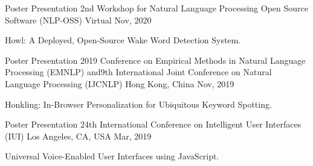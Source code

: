 \begin{cventries}
{\begin{cvitems}
\end{cvitems}
}
\cventry
{Poster Presentation} %
{2nd Workshop for Natural Language Processing Open Source Software (NLP-OSS)} %
{Virtual} %
{Nov, 2020} %
{ %
\begin{cvitems}
\item {Howl: A Deployed, Open-Source Wake Word Detection System.}
\end{cvitems}
}
\cventry
{Poster Presentation} %
{2019 Conference on Empirical Methods in Natural Language Processing (EMNLP) and\newline 9th International Joint Conference on Natural Language Processing (IJCNLP)} %
{Hong Kong, China} %
{Nov, 2019} %
{ %
\begin{cvitems}
\item {Honkling: In-Browser Personalization for Ubiquitous Keyword Spotting.}
\end{cvitems}
}
\cventry
{Poster Presentation} %
{24th International Conference on Intelligent User Interfaces (IUI)} %
{Los Angeles, CA, USA} %
{Mar, 2019} %
{ %
\begin{cvitems}
\item {Universal Voice-Enabled User Interfaces using JavaScript.}
\end{cvitems}
}
\end{cventries}


